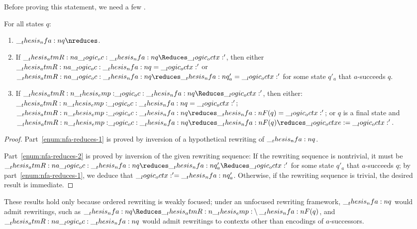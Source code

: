 Before proving this statement, we need a few .
%
\begin{lemma}\label{lem:nfa-reduces}
  For all states $q$:
  \begin{enumerate}[nosep]
  \item\label{enum:nfa-reduces-1} $\nfa{q} \nreduces$.
  \item\label{enum:nfa-reduces-2} If $\atmR{a} \oc \nfa{q} \Reduces \octx'$, then either $\__thesis_atmR:n {a} \__logic_oc: \__thesis_nfa:n {q} = \__logic_octx:'$ or $\atmR{a} \oc \nfa{q} \reduces \nfa{q}'_a = \octx'$ for some state $q'_a$ that $a$-succeeds $q$.
  \item\label{enum:nfa-reduces-3} If $\atmR{\emp} \oc \nfa{q} \Reduces \octx'$, then either: $\__thesis_atmR:n {\__thesis_emp:} \__logic_oc: \__thesis_nfa:n {q} = \__logic_octx:'$; $\atmR{\emp} \oc \nfa{q} \reduces \nfa{F}(q) = \octx'$; or $q$ is a final state and $\atmR{\emp} \oc \nfa{q} \reduces \nfa{F}(q) \reduces \octxe = \octx'$.
  \end{enumerate}
\end{lemma}
\begin{proof}
  Part~\ref{enum:nfa-reduces-1} is proved by inversion of a hypothetical rewriting of $\__thesis_nfa:n {q}$.

  Part~\ref{enum:nfa-reduces-2} is proved by inversion of the given rewriting sequence:
  If the rewriting sequence is nontrivial, it must be $\atmR{a} \oc \nfa{q} \reduces \nfa{q}'_a \Reduces \octx'$ for some state $q'_a$ that $a$-succeeds $q$; by part~\ref{enum:nfa-reduces-1}, we deduce that $\__logic_octx:' = \__thesis_nfa:n {q}'_a$.
  Otherwise, if the rewriting sequence is trivial, the desired result is immediate.
\end{proof}
%
\noindent
These results hold only because ordered rewriting is weakly focused;
under an unfocused rewriting framework, $\__thesis_nfa:n {q}$ would admit rewritings, such as $\nfa{q} \Reduces \atmR{\emp} \limp \nfa{F}(q)$, and $\__thesis_atmR:n {a} \__logic_oc: \__thesis_nfa:n {q}$ would admit rewritings to contexts other than encodings of $a$-successors.


